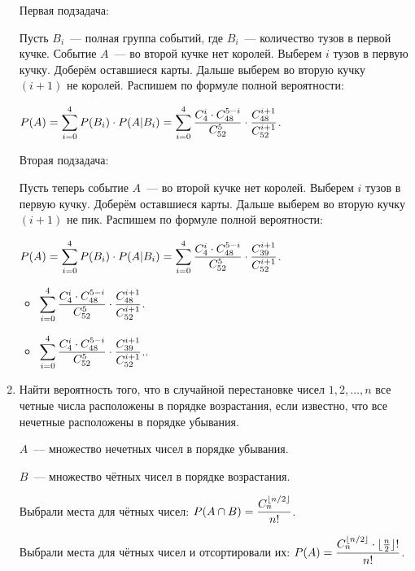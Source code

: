 \documentclass{article}
\begin{document}
\begin{enumerate}
    \solution{}

    Первая подзадача:

    Пусть ${B_i}$~--- полная группа событий, где $B_i$~--- количество тузов в первой кучке. Событие $A$~--- во второй кучке нет королей. Выберем $i$ тузов в первую кучку. Доберём оставшиеся карты. Дальше выберем во вторую кучку $(i + 1)$ не королей. Распишем по формуле полной вероятности:

    $\displaystyle{P(A) = \sum\limits_{i = 0}^4 P(B_i) \cdot P(A|B_i) = \sum\limits_{i = 0}^4 \frac{C_4^i \cdot C_{48}^{5 - i}}{C_{52}^5} \cdot \frac{C_{48}^{i + 1}}{C_{52}^{i + 1}}}$.

    Вторая подзадача:

    Пусть теперь событие $A$~--- во второй кучке нет королей. Выберем $i$ тузов в первую кучку. Доберём оставшиеся карты. Дальше выберем во вторую кучку $(i + 1)$ не пик. Распишем по формуле полной вероятности:

    $\displaystyle{P(A) = \sum\limits_{i = 0}^4 P(B_i) \cdot P(A|B_i) = \sum\limits_{i = 0}^4 \frac{C_4^i \cdot C_{48}^{5 - i}}{C_{52}^5} \cdot \frac{C_{39}^{i + 1}}{C_{52}^{i + 1}}}$.

    \answer{}

    \begin{itemize}
        \item $\displaystyle{\sum\limits_{i = 0}^4 \frac{C_4^i \cdot C_{48}^{5 - i}}{C_{52}^5} \cdot \frac{C_{48}^{i + 1}}{C_{52}^{i + 1}}}$.
        \item $\displaystyle{\sum\limits_{i = 0}^4 \frac{C_4^i \cdot C_{48}^{5 - i}}{C_{52}^5} \cdot \frac{C_{39}^{i + 1}}{C_{52}^{i + 1}}}$..
    \end{itemize}

    \item Найти вероятность того, что в случайной перестановке чисел $1, 2, \ldots, n$ все четные числа расположены в порядке возрастания, если известно, что все нечетные расположены в порядке убывания. 

    \solution{}

    $A$~--- множество нечетных чисел в порядке убывания.

    $B$~--- множество чётных чисел в порядке возрастания.

    Выбрали места для чётных чисел: $\displaystyle{P(A \cap B) = \frac{C_n^{\lfloor n / 2 \rfloor}}{n!}}$.

    Выбрали места для чётных чисел и отсортировали их: $\displaystyle{P(A) = \frac{C_n^{\lfloor n / 2 \rfloor} \cdot \lfloor\frac{n}{2}\rfloor !}{n!}}$.


\end{enumerate}
\end{document}
